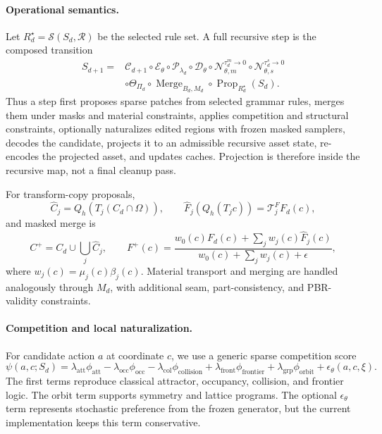 \paragraph{Operational semantics.}
Let \(R_d^\star=\mathcal{S}(S_d,\mathcal{R})\) be the selected rule set. A full recursive step is the composed transition
\begin{equation}
\begin{split}
S_{d+1}
=&
\mathcal{C}_{d+1}\circ
\mathcal{E}_\theta\circ
\mathcal{P}_{\lambda_d}\circ
\mathcal{D}_\theta\circ
\mathcal{N}_{\theta,m}^{\tau_d^m\rightarrow0}\circ
\mathcal{N}_{\theta,s}^{\tau_d^s\rightarrow0}
\\
&\circ
\Theta_{\Pi_d}\circ
\operatorname{Merge}_{B_d,M_d}\circ
\operatorname{Prop}_{R_d^\star}(S_d).
\end{split}
\end{equation}
Thus a step first proposes sparse patches from selected grammar rules, merges them under masks and material constraints, applies competition and structural constraints, optionally naturalizes edited regions with frozen masked samplers, decodes the candidate, projects it to an admissible recursive asset state, re-encodes the projected asset, and updates caches. Projection is therefore inside the recursive map, not a final cleanup pass.

For transform-copy proposals,
\begin{equation}
\widehat C_j=Q_h(T_j(C_d\cap\Omega)),\qquad
\widehat F_j(Q_h(T_jc))=\mathcal{T}_j^F F_d(c),
\end{equation}
and masked merge is
\begin{equation}
C^+=C_d\cup\bigcup_j\widehat C_j,
\qquad
F^+(c)=
\frac{w_0(c)F_d(c)+\sum_j w_j(c)\widehat F_j(c)}
{w_0(c)+\sum_jw_j(c)+\epsilon},
\end{equation}
where \(w_j(c)=\mu_j(c)\beta_j(c)\). Material transport and merging are handled analogously through \(M_d\), with additional seam, part-consistency, and PBR-validity constraints.

\paragraph{Competition and local naturalization.}
For candidate action \(a\) at coordinate \(c\), we use a generic sparse competition score
\begin{equation}
\psi(a,c;S_d)=
\lambda_{\mathrm{att}}\phi_{\mathrm{att}}
-\lambda_{\mathrm{occ}}\phi_{\mathrm{occ}}
-\lambda_{\mathrm{col}}\phi_{\mathrm{collision}}
+\lambda_{\mathrm{front}}\phi_{\mathrm{frontier}}
+\lambda_{\mathrm{grp}}\phi_{\mathrm{orbit}}
+\epsilon_{\theta}(a,c,\xi).
\end{equation}
The first terms reproduce classical attractor, occupancy, collision, and frontier logic. The orbit term supports symmetry and lattice programs. The optional \(\epsilon_{\theta}\) term represents stochastic preference from the frozen generator, but the current implementation keeps this term conservative.

